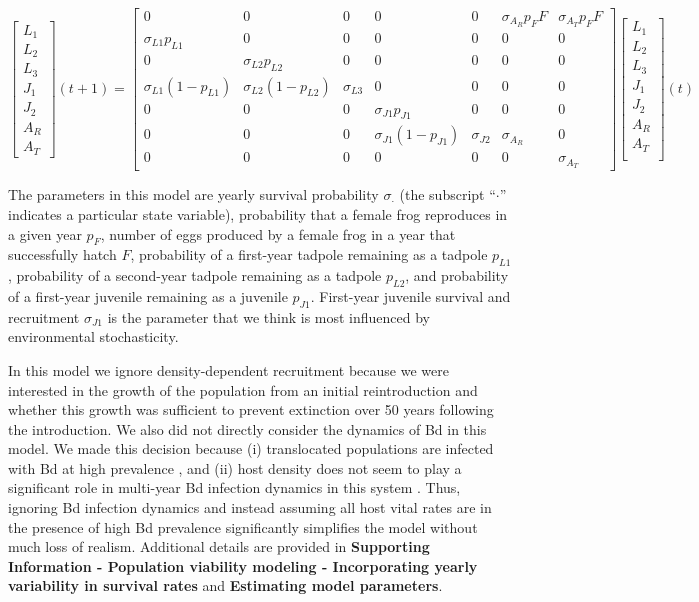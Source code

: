 \documentclass[
  letterpaper,
  DIV=11,
  numbers=noendperiod]{scrartcl}
\begin{document}
\[
\begin{bmatrix}
L_1 \\
L_2 \\
L_3 \\
J_1 \\
J_2 \\
A_R \\ 
A_T
\end{bmatrix}(t + 1) = 
\begin{bmatrix}
  0 & 0 & 0 & 0 & 0 & \sigma_{A_R} p_F F & \sigma_{A_T} p_F F \\
  \sigma_{L1} p_{L1} & 0 & 0 & 0 & 0 & 0 & 0 \\
  0 & \sigma_{L2} p_{L2} & 0 & 0 & 0 & 0 & 0\\
  \sigma_{L1} (1 - p_{L1}) & \sigma_{L2} (1 - p_{L2}) & \sigma_{L3} & 0 & 0 & 0 & 0 \\
  0 & 0 & 0 & \sigma_{J1} p_{J1} & 0 & 0 & 0 \\
  0 & 0 & 0 & \sigma_{J1} (1 - p_{J1}) & \sigma_{J2}  & \sigma_{A_R} & 0 \\
  0 & 0 & 0 & 0 & 0 & 0 & \sigma_{A_T} 
\end{bmatrix} \begin{bmatrix}
L_1 \\
L_2 \\
L_3 \\
J_1 \\
J_2 \\
A_R \\
A_T \\
\end{bmatrix}(t) 
\]

The parameters in this model are yearly survival probability
\(\sigma_{\cdot}\) (the subscript ``\(\cdot\)'' indicates a particular
state variable), probability that a female frog reproduces in a given
year \(p_F\), number of eggs produced by a female frog in a year that
successfully hatch \(F\), probability of a first-year tadpole remaining
as a tadpole \(p_{L1}\), probability of a second-year tadpole remaining
as a tadpole \(p_{L2}\), and probability of a first-year juvenile
remaining as a juvenile \(p_{J1}\). First-year juvenile survival and
recruitment \(\sigma_{J1}\) is the parameter that we think is most
influenced by environmental stochasticity.

In this model we ignore density-dependent recruitment because we were
interested in the growth of the population from an initial
reintroduction and whether this growth was sufficient to prevent
extinction over 50 years following the introduction. We also did not
directly consider the dynamics of Bd in this model. We made this
decision because (i) translocated populations are infected with Bd at
high prevalence \citep{joseph2018}, and (ii) host density does not seem
to play a significant role in multi-year Bd infection dynamics in this
system \citep{wilber2022}. Thus, ignoring Bd infection dynamics and
instead assuming all host vital rates are in the presence of high Bd
prevalence significantly simplifies the model without much loss of
realism. Additional details are provided in \textbf{Supporting
Information - Population viability modeling - Incorporating yearly
variability in survival rates} and \textbf{Estimating model parameters}.
\end{document}
